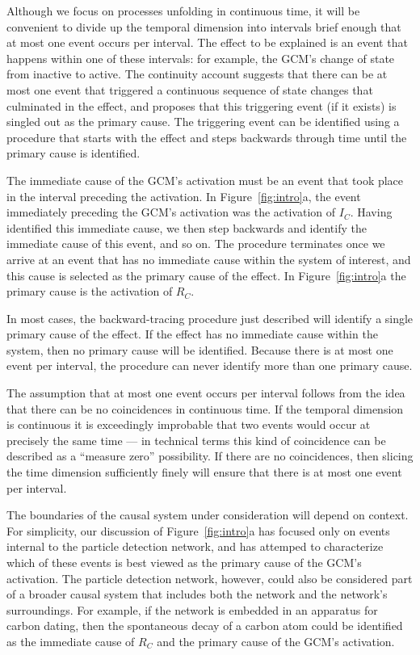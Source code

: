 \documentclass[10pt,letterpaper]{article}
\newcommand{\ev}[2]{$#1_#2$}
\begin{document}
Although we focus on processes unfolding in continuous time, it will be convenient to divide up the temporal dimension into intervals brief enough that at most one event occurs per interval. The effect to be explained is an event that happens within one of these intervals: for example, the GCM's change of state from inactive to active. The continuity account suggests that there can be at most one event that triggered a continuous sequence of state changes that culminated in the effect, and proposes that this triggering event (if it exists) is singled out as the primary cause. The triggering event can be identified using a procedure that starts with the effect and steps backwards through time until the primary cause is identified.

The immediate cause of the GCM's activation must be an event that took place in the interval preceding the activation. In Figure~\ref{fig:intro}a, the event immediately preceding the GCM's activation was the activation of \ev{I}{C}. Having identified this immediate cause, we then step backwards and identify the immediate cause of this event, and so on.  The procedure terminates once we arrive at an event that has no immediate cause within the system of interest, 
and this cause is selected as the primary cause of the effect.  In Figure~\ref{fig:intro}a the primary cause is the activation of \ev{R}{C}. 

In most cases, the backward-tracing procedure just described will identify a single primary cause of the effect. If the effect has no immediate cause within the system, then no primary cause will be identified. Because there is at most one event per interval, the procedure can never identify more than one primary cause.

The assumption that at most one event occurs per interval follows from the idea that there can be no coincidences in continuous time. If the temporal dimension is continuous it is exceedingly improbable that two events would occur at precisely the same time --- in technical terms this kind of coincidence can be described as a ``measure zero'' possibility. If there are no coincidences, then slicing the time dimension sufficiently finely will ensure that there is at most one event per interval.

The boundaries of the causal system under consideration will depend on context. For simplicity, our discussion of Figure~\ref{fig:intro}a has focused only on events internal to the particle detection network, and has attemped to characterize which of these events is best viewed as the primary cause of the GCM's activation. The particle detection network, however, could also be considered part of a broader causal system that includes both the network and the network's surroundings. For example, if the network is embedded in an apparatus for carbon dating, then the spontaneous decay of a carbon atom could be identified as the immediate cause of \ev{R}{C} and the primary cause of the GCM's activation.
\end{document}

